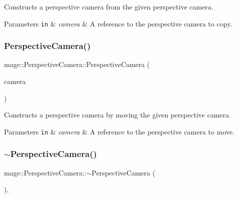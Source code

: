 Constructs a perspective camera from the given perspective camera.


\begin{DoxyParams}[1]{Parameters}
\mbox{\tt in}  & {\em camera} & A reference to the perspective camera to copy. \\
\hline
\end{DoxyParams}
\hypertarget{classmage_1_1_perspective_camera_a04531e5b956e72300337571e0eb7143d}{}\label{classmage_1_1_perspective_camera_a04531e5b956e72300337571e0eb7143d} 
\subsubsection{\texorpdfstring{Perspective\+Camera()}{PerspectiveCamera()}\hspace{0.1cm}{\footnotesize\ttfamily [6/6]}}
{\footnotesize\ttfamily mage\+::\+Perspective\+Camera\+::\+Perspective\+Camera (\begin{DoxyParamCaption}\item[{\hyperlink{classmage_1_1_perspective_camera}{Perspective\+Camera} \&\&}]{camera }\end{DoxyParamCaption})\hspace{0.3cm}{\ttfamily [default]}}

Constructs a perspective camera by moving the given perspective camera.


\begin{DoxyParams}[1]{Parameters}
\mbox{\tt in}  & {\em camera} & A reference to the perspective camera to move. \\
\hline
\end{DoxyParams}
\hypertarget{classmage_1_1_perspective_camera_a47ba88d7458528795dd832474cdb3eb9}{}\label{classmage_1_1_perspective_camera_a47ba88d7458528795dd832474cdb3eb9} 
\subsubsection{\texorpdfstring{$\sim$\+Perspective\+Camera()}{~PerspectiveCamera()}}
{\footnotesize\ttfamily mage\+::\+Perspective\+Camera\+::$\sim$\+Perspective\+Camera (\begin{DoxyParamCaption}{ }\end{DoxyParamCaption})\hspace{0.3cm}{\ttfamily [virtual]}, {\ttfamily [default]}}

